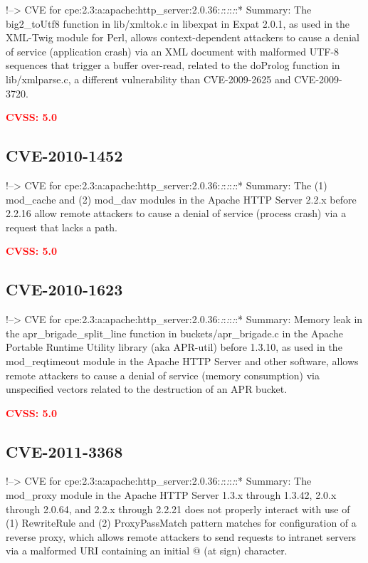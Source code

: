 \documentclass[a4paper, 12pt]{article}
\begin{document}
!--\textgreater{} CVE for
cpe:2.3:a:apache:http\_server:2.0.36:\emph{:}:\emph{:}:\emph{:}:*
Summary: The big2\_toUtf8 function in lib/xmltok.c in libexpat in Expat
2.0.1, as used in the XML-Twig module for Perl, allows context-dependent
attackers to cause a denial of service (application crash) via an XML
document with malformed UTF-8 sequences that trigger a buffer over-read,
related to the doProlog function in lib/xmlparse.c, a different
vulnerability than CVE-2009-2625 and CVE-2009-3720.

\textbf{\textcolor{red}{CVSS: 5.0}}

\hypertarget{cve-2010-1452}{%
\subsection{CVE-2010-1452}\label{cve-2010-1452}}

!--\textgreater{} CVE for
cpe:2.3:a:apache:http\_server:2.0.36:\emph{:}:\emph{:}:\emph{:}:*
Summary: The (1) mod\_cache and (2) mod\_dav modules in the Apache HTTP
Server 2.2.x before 2.2.16 allow remote attackers to cause a denial of
service (process crash) via a request that lacks a path.

\textbf{\textcolor{red}{CVSS: 5.0}}

\hypertarget{cve-2010-1623}{%
\subsection{CVE-2010-1623}\label{cve-2010-1623}}

!--\textgreater{} CVE for
cpe:2.3:a:apache:http\_server:2.0.36:\emph{:}:\emph{:}:\emph{:}:*
Summary: Memory leak in the apr\_brigade\_split\_line function in
buckets/apr\_brigade.c in the Apache Portable Runtime Utility library
(aka APR-util) before 1.3.10, as used in the mod\_reqtimeout module in
the Apache HTTP Server and other software, allows remote attackers to
cause a denial of service (memory consumption) via unspecified vectors
related to the destruction of an APR bucket.

\textbf{\textcolor{red}{CVSS: 5.0}}

\hypertarget{cve-2011-3368}{%
\subsection{CVE-2011-3368}\label{cve-2011-3368}}

!--\textgreater{} CVE for
cpe:2.3:a:apache:http\_server:2.0.36:\emph{:}:\emph{:}:\emph{:}:*
Summary: The mod\_proxy module in the Apache HTTP Server 1.3.x through
1.3.42, 2.0.x through 2.0.64, and 2.2.x through 2.2.21 does not properly
interact with use of (1) RewriteRule and (2) ProxyPassMatch pattern
matches for configuration of a reverse proxy, which allows remote
attackers to send requests to intranet servers via a malformed URI
containing an initial @ (at sign) character.
\end{document}
